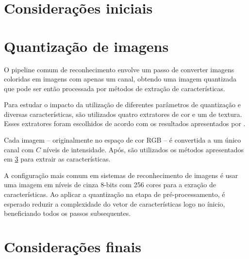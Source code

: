 \section{Considerações iniciais}


\section{Quantização de imagens}

O pipeline comum de reconhecimento envolve um passo de converter imagens coloridas em imagens com apenas um canal, obtendo uma imagem quantizada que pode ser então processada por métodos de extração de características.

Para estudar o impacto da utilização de diferentes parâmetros de quantização e diversas características, são utilizados quatro extratores de cor e um de textura. Esses extratores foram escolhidos de acordo com os resultados apresentados por .

Cada imagem -- originalmente no espaço de cor RGB -- é convertida a um único canal com $C$ níveis de intensidade. Após, são utilizados os métodos apresentados em \ref{} para extrair as características.

A configuração mais comum em sistemas de reconhecimento de imagens é usar uma imagem em níveis de cinza 8-bits com 256 cores para a exração de características. Ao aplicar a quantização na etapa de pré-processamento, é esperado reduzir a complexidade do vetor de características logo no ínicio, beneficiando todos os passos subsequentes.

\section{Considerações finais}
